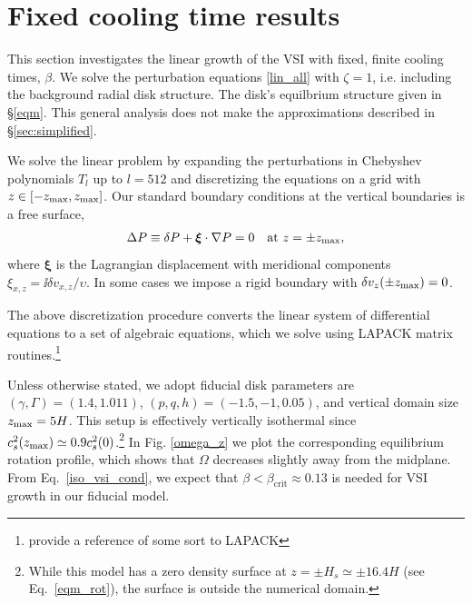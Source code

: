 \section{Fixed cooling time results}\label{numerical}
This section investigates the linear growth of the VSI with fixed, finite cooling times, $\beta$. 
We solve the perturbation equations \ref{lin_all} with $\zeta=1$, i.e. including the background radial disk structure.  
The disk's equilbrium  structure given in \S\ref{eqm}.  This general analysis does not make the approximations 
described in \S\ref{sec:simplified}.

We solve the linear problem by expanding the 
perturbations in Chebyshev polynomials $T_l$ up to $l=512$
and discretizing the equations on a grid with
$z\in[-z_\mathrm{max},z_\mathrm{max}]$. Our standard boundary conditions at the vertical
boundaries is a free surface,  
\begin{align}
  \Delta P \equiv \delta P + \bm{\xi}\cdot\nabla P= 0 \quad \text{at } z=\pm z_\mathrm{max},
\end{align}
where $\bm{\xi}$ is the Lagrangian displacement with meridional 
components $\xi_{x,z} = \ii\delta v_{x,z}/\upsilon$. In some cases we
impose a rigid boundary with $\delta v_z(\pm z_\mathrm{max})=0$. 

The above discretization procedure
converts the linear system of differential equations to a set of 
algebraic equations,  which we solve using LAPACK matrix routines.\footnote{provide a reference of some sort to LAPACK} 

Unless otherwise stated, we adopt fiducial disk parameters are 
$(\gamma, \Gamma) = (1.4, 1.011)$, $(p,q, h)=(-1.5,-1,0.05)$, and 
vertical domain size $z_\mathrm{max}=5H$. This setup is effectively vertically
isothermal since $c_s^2(z_\mathrm{max}) \simeq 0.9c_s^2(0)$.\footnote{While this model
has a zero density surface at $z = \pm H_s \simeq \pm 16.4 H$ (see Eq.\ \ref{eqm_rot}), the surface is 
outside the numerical domain.} In Fig. \ref{omega_z}
we plot the corresponding equilibrium rotation profile, which shows
that $\Omega$ decreases slightly away from the midplane.   From Eq.\ \ref{iso_vsi_cond},
we expect that $\beta < \beta_\mathrm{crit} \approx 0.13$ is needed for VSI growth in our fiducial model. 

